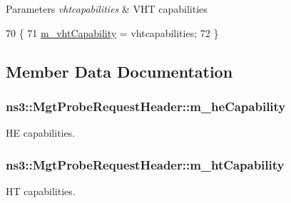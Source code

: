 \begin{DoxyParams}{Parameters}
{\em vhtcapabilities} & V\+HT capabilities \\
\hline
\end{DoxyParams}

\begin{DoxyCode}
70 \{
71   \hyperlink{classns3_1_1MgtProbeRequestHeader_acfd190373f8c431aa709e18d44fb368f}{m\_vhtCapability} = vhtcapabilities;
72 \}
\end{DoxyCode}


\subsection{Member Data Documentation}
\subsubsection[{\texorpdfstring{m\+\_\+he\+Capability}{m_heCapability}}]{ ns3\+::\+Mgt\+Probe\+Request\+Header\+::m\+\_\+he\+Capability\hspace{0.3cm}{\ttfamily [private]}}\hypertarget{classns3_1_1MgtProbeRequestHeader_a4b65c6f1e5d8da451bd4e84f2ddda08d}{}\label{classns3_1_1MgtProbeRequestHeader_a4b65c6f1e5d8da451bd4e84f2ddda08d}


HE capabilities. 

\subsubsection[{\texorpdfstring{m\+\_\+ht\+Capability}{m_htCapability}}]{ ns3\+::\+Mgt\+Probe\+Request\+Header\+::m\+\_\+ht\+Capability\hspace{0.3cm}{\ttfamily [private]}}\hypertarget{classns3_1_1MgtProbeRequestHeader_a90020bd13c4ddb5b4bb94b734e523cef}{}\label{classns3_1_1MgtProbeRequestHeader_a90020bd13c4ddb5b4bb94b734e523cef}


HT capabilities. 

